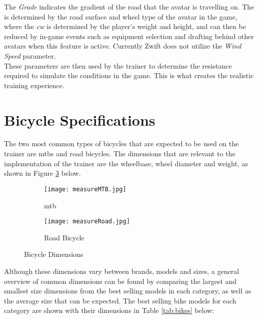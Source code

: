 The \textit{Grade} indicates the gradient of the road that the avatar is travelling on. The  is determined by the road surface and wheel type of the avatar in the game, where the \textit{\ac{cw}} is determined by the player's weight and height, and can then be reduced by in-game events such as equipment selection and drafting behind other avatars when this feature is active. Currently Zwift does not utilize the \textit{Wind Speed} parameter.\\
These parameters are then used by the trainer to determine the resistance required to simulate the conditions in the game. This is what creates the realistic training experience.

\section{Bicycle Specifications}
The two most common types of bicycles that are expected to be used on the trainer are \acp{mtb} and road bicycles. The dimensions that are relevant to the implementation of the trainer are the wheelbase, wheel diameter and weight, as shown in Figure \ref{fig:bikeDim} below.

\begin{figure}[H]
	\centering
	\begin{subfigure}{.5\textwidth}
		\centering
		\texttt{[image: measureMTB.jpg]}
		\caption{\ac{mtb} \citep[model by:][]{Pratama:2021}}
		\label{fig:sub1}
	\end{subfigure}%
	\begin{subfigure}{.5\textwidth}
		\centering
		\texttt{[image: measureRoad.jpg]}
		\caption{Road Bicycle \citep[model by:][]{Morozev:2017}}
		\label{fig:sub2}
	\end{subfigure}
	\caption{Bicycle Dimensions}
	\label{fig:bikeDim}
\end{figure}

Although these dimensions vary between brands, models and sizes, a general overview of common dimensions can be found by comparing the largest and smallest size dimensions from the best selling models in each category, as well as the average size that can be expected. The best selling bike models for each category are shown with their dimensions in Table \ref{tab:bikes} below: \citep{Lin:2021}

